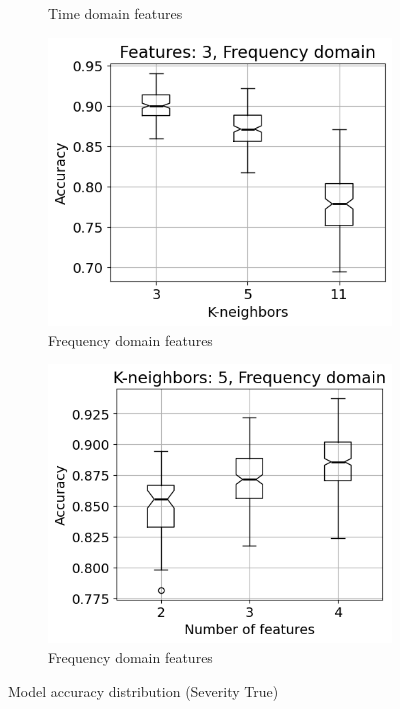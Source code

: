\begin{figure}[h]
\begin{subfigure}[b]{0.48\textwidth}
        \caption{Time domain features}
    \end{subfigure}
    \hfill
    \begin{subfigure}[b]{0.48\textwidth}
        \includegraphics[width=\textwidth]{assets/results/feature-combinations/FD-3-A-True-False-F3.png}
        \caption{Frequency domain features}
    \end{subfigure}
    \hfill
    \begin{subfigure}[b]{0.48\textwidth}
        \includegraphics[width=\textwidth]{assets/results/feature-combinations/FD-3-A-True-False-K5.png}
        \caption{Frequency domain features}
    \end{subfigure}
    \caption{Model accuracy distribution (Severity True)}
\end{figure}


